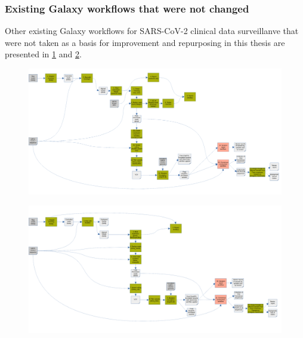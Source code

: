         \subsubsection{Existing Galaxy workflows that were not changed} \label{sec:appendix:figures:wfs}
        Other existing Galaxy workflows for SARS-CoV-2 clinical data surveillanve that were not taken as a basis for improvement and repurposing in this thesis are presented in \cref{fig:further:ont-wf} and \cref{fig:further:illumina-wf}.
        \begin{landscape}
        \centering\vspace*{\fill}
        \begin{figure}[ht!]
        	\centering
            \includegraphics[width=1.4\textwidth]{figures/further/further-ont-wf.png}
            \label{fig:further:ont-wf}
        \end{figure}
        \begin{figure}[ht!]
        	\centering
            \includegraphics[width=1.4\textwidth]{figures/further/further-illumina-wf.png}
            \label{fig:further:illumina-wf}
        \end{figure}
        \vfill
        \end{landscape}
        
